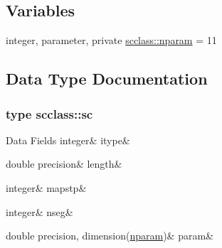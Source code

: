 \subsection*{Variables}
\begin{DoxyCompactItemize}
\item 
integer, parameter, private \mbox{\hyperlink{namespacescclass_a78eec9a89964d83818db291873df4436}{scclass\+::nparam}} = 11
\end{DoxyCompactItemize}


\subsection{Data Type Documentation}
\label{structscclass_1_1sc}
\subsubsection{type scclass\+::sc}
\begin{DoxyFields}{Data Fields}
\mbox{\label{namespacescclass_a4ddd6baf3b915cf7ff25830e84ce6e75}} 
integer&
itype&
\\
\hline

\mbox{\label{namespacescclass_ae9c1bce2c31838e6ec98bdbfe04cb6d7}} 
double precision&
length&
\\
\hline

\mbox{\label{namespacescclass_ac919c69cd2bb089386f56a5ac75728f0}} 
integer&
mapstp&
\\
\hline

\mbox{\label{namespacescclass_a32cf6178c767aecb2b10b7baa0221c78}} 
integer&
nseg&
\\
\hline

\mbox{\label{namespacescclass_a21e20d06bda8473fab959e3ee29e5183}} 
double precision, dimension(\mbox{\hyperlink{namespacescclass_a78eec9a89964d83818db291873df4436}{nparam}})&
param&
\\
\hline

\end{DoxyFields}
